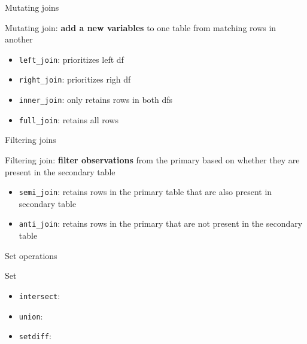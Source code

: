 \documentclass[ignorenonframetext,]{beamer}
\providecommand{\tightlist}{%
  \setlength{\itemsep}{0pt}\setlength{\parskip}{0pt}}
\begin{document}
\begin{frame}[fragile]{Mutating joins}

\begin{block}{Mutating join: \textbf{add a new variables} to one table
from matching rows in another}

\begin{itemize}
\tightlist
\item
  \texttt{left\_join}: prioritizes left df
\item
  \texttt{right\_join}: prioritizes righ df
\item
  \texttt{inner\_join}: only retains rows in both dfs
\item
  \texttt{full\_join}: retains all rows
\end{itemize}

\end{block}

\end{frame}

\begin{frame}[fragile]{Filtering joins}

\begin{block}{Filtering join: \textbf{filter observations} from the
primary based on whether they are present in the secondary table}

\begin{itemize}
\tightlist
\item
  \texttt{semi\_join}: retains rows in the primary table that are also
  present in secondary table
\item
  \texttt{anti\_join}: retains rows in the primary that are not present
  in the secondary table
\end{itemize}

\end{block}

\end{frame}

\begin{frame}[fragile]{Set operations}

\begin{block}{Set}

\begin{itemize}
\tightlist
\item
  \texttt{intersect}:
\item
  \texttt{union}:
\item
  \texttt{setdiff}:
\end{itemize}

\end{block}

\end{frame}
\end{document}
